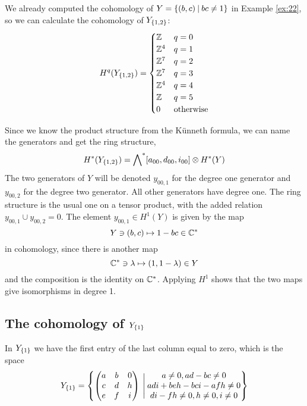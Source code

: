 We already computed the cohomology of $Y =\left\{ (b,c)\: \vert\:
  bc\neq 1 \right\}$ in Example \ref{ex:22}, so we can calculate the
cohomology of $Y_{\left\{ 1,2 \right\}}$:
\[ H^q(Y_{\left\{ 1,2 \right\}}) =
\begin{cases}
  \mathbb{Z} & q = 0 \\
  \mathbb{Z}^4 & q = 1 \\
  \mathbb{Z}^7 & q = 2 \\
  \mathbb{Z}^7 & q = 3 \\
  \mathbb{Z}^4 & q = 4 \\
  \mathbb{Z} & q = 5 \\
  0 & \text{otherwise}
\end{cases} \]

Since we know the product structure from the K\"unneth formula, we can
name the generators and get the ring structure,
\[ H^*(Y_{\left\{ 1,2 \right\}}) = \bigwedge\nolimits^*[a_{00},d_{00},i_{00}]\otimes
H^*(Y) \]
The two generators of $Y$ will be denoted $y_{00,1}$ for the degree
one generator and $y_{00,2}$ for the degree two generator. All other
generators have degree one. The ring
structure is the usual one on a tensor product, with the added
relation $y_{00,1}\cup y_{00,2} = 0$. The element $y_{00,1}\in H^1(Y)$
is given by the map
\[ Y\ni (b,c) \mapsto 1-bc\in \mathbb{C}^* \]
in cohomology, since there is another map
\[ \mathbb{C}^* \ni \lambda \mapsto (1,1-\lambda) \in Y \]
and the composition is the identity on $\mathbb{C}^*$. Applying $H^1$ shows
that the two maps give isomorphisms in degree 1.


\subsection{The cohomology of $Y_{\left\{ 1 \right\}}$}

In $Y_{\left\{ 1 \right\}}$ we have the first entry of the last column equal to
zero, which is the space
\[ Y_{\left\{ 1 \right\}} = \left\{ 
  \begin{pmatrix}
    a & b & 0 \\
    c & d & h \\
    e & f & i
  \end{pmatrix} \:\Bigg\vert\:
  \begin{matrix}
    a \neq 0, ad-bc \neq 0 \\
    adi + beh - bci - afh \neq 0 \\
    di -fh \neq 0, h \neq 0, i \neq 0 
  \end{matrix}
 \right\} \]


